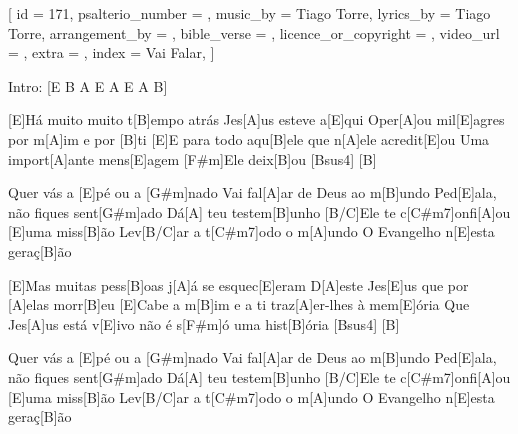 
[
    id                     = {171},
    psalterio_number       = {},
    music_by               = {Tiago Torre},
    lyrics_by              = {Tiago Torre},
    arrangement_by         = {},
    bible_verse            = {},
    licence_or_copyright   = {},
    video_url              = {},
    extra                  = {},
    index                  = {Vai Falar},
]

\beginverse
Intro:
[E B A E A E A B]
\endverse

\beginverse

[E]Há muito muito t[B]empo atrás Jes[A]us esteve a[E]qui
Oper[A]ou mil[E]agres por m[A]im e por [B]ti
[E]E para todo aqu[B]ele que n[A]ele acredit[E]ou
Uma import[A]ante mens[E]agem [F#m]Ele deix[B]ou [Bsus4] [B]

\endverse


\beginchorus

Quer vás a [E]pé ou a [G#m]nado
Vai fal[A]ar de Deus ao m[B]undo
Ped[E]ala, não fiques sent[G#m]ado
Dá[A] teu testem[B]unho
[B/C]Ele te c[C#m7]onfi[A]ou [E]uma miss[B]ão
Lev[B/C]ar a t[C#m7]odo o m[A]undo
O Evangelho n[E]esta geraç[B]ão

\endchorus


\beginverse

[E]Mas muitas pess[B]oas j[A]á se esquec[E]eram
D[A]este Jes[E]us que por [A]elas morr[B]eu
[E]Cabe a m[B]im e a ti traz[A]er-lhes à mem[E]ória
Que Jes[A]us está v[E]ivo não é s[F#m]ó uma hist[B]ória [Bsus4] [B]

\endverse


\beginchorus

Quer vás a [E]pé ou a [G#m]nado
Vai fal[A]ar de Deus ao m[B]undo
Ped[E]ala, não fiques sent[G#m]ado
Dá[A] teu testem[B]unho
[B/C]Ele te c[C#m7]onfi[A]ou [E]uma miss[B]ão
Lev[B/C]ar a t[C#m7]odo o m[A]undo
O Evangelho n[E]esta geraç[B]ão

\endchorus



\beginverse

